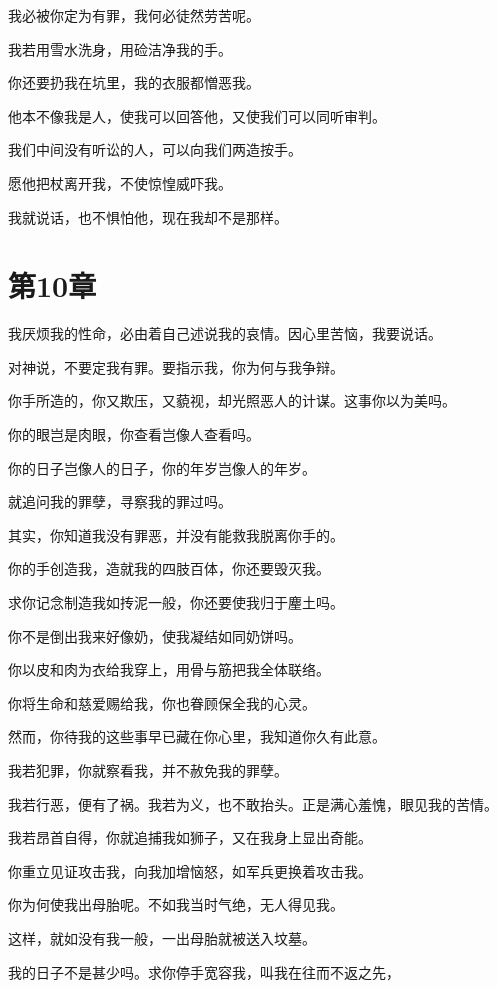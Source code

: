 \documentclass[12pt,oneside]{book}
\begin{document}
我必被你定为有罪，我何必徒然劳苦呢。

我若用雪水洗身，用硷洁净我的手。

你还要扔我在坑里，我的衣服都憎恶我。

他本不像我是人，使我可以回答他，又使我们可以同听审判。

我们中间没有听讼的人，可以向我们两造按手。

愿他把杖离开我，不使惊惶威吓我。

我就说话，也不惧怕他，现在我却不是那样。



\chapter{第10章}
我厌烦我的性命，必由着自己述说我的哀情。因心里苦恼，我要说话。

对神说，不要定我有罪。要指示我，你为何与我争辩。

你手所造的，你又欺压，又藐视，却光照恶人的计谋。这事你以为美吗。

你的眼岂是肉眼，你查看岂像人查看吗。

你的日子岂像人的日子，你的年岁岂像人的年岁。

就追问我的罪孽，寻察我的罪过吗。

其实，你知道我没有罪恶，并没有能救我脱离你手的。

你的手创造我，造就我的四肢百体，你还要毁灭我。

求你记念制造我如抟泥一般，你还要使我归于麈土吗。

你不是倒出我来好像奶，使我凝结如同奶饼吗。

你以皮和肉为衣给我穿上，用骨与筋把我全体联络。

你将生命和慈爱赐给我，你也眷顾保全我的心灵。

然而，你待我的这些事早已藏在你心里，我知道你久有此意。

我若犯罪，你就察看我，并不赦免我的罪孽。

我若行恶，便有了祸。我若为义，也不敢抬头。正是满心羞愧，眼见我的苦情。

我若昂首自得，你就追捕我如狮子，又在我身上显出奇能。

你重立见证攻击我，向我加增恼怒，如军兵更换着攻击我。

你为何使我出母胎呢。不如我当时气绝，无人得见我。

这样，就如没有我一般，一出母胎就被送入坟墓。

我的日子不是甚少吗。求你停手宽容我，叫我在往而不返之先，
\end{document}
